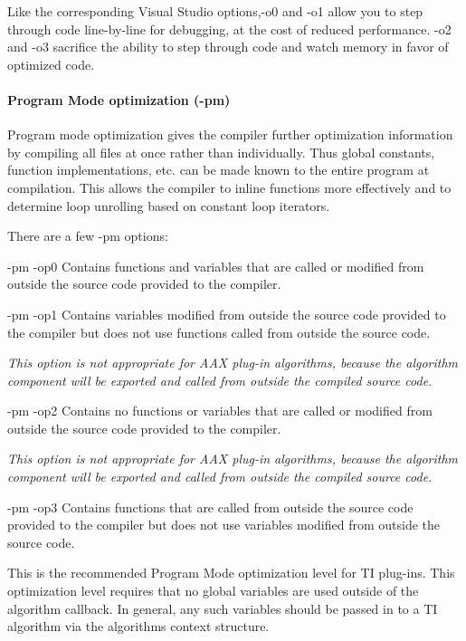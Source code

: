 Like the corresponding Visual Studio options,{\ttfamily -\/o0} and {\ttfamily -\/o1} allow you to step through code line-\/by-\/line for debugging, at the cost of reduced performance. {\ttfamily -\/o2} and {\ttfamily -\/o3} sacrifice the ability to step through code and watch memory in favor of optimized code.

\hypertarget{a00832_subsubsection__program_mode_optimization_pm_}{}\paragraph{Program Mode optimization (-\/pm)}\label{a00832_subsubsection__program_mode_optimization_pm_}
 Program mode optimization gives the compiler further optimization information by compiling all files at once rather than individually. Thus global constants, function implementations, etc. can be made known to the entire program at compilation. This allows the compiler to inline functions more effectively and to determine loop unrolling based on constant loop iterators.

There are a few {\ttfamily -\/pm} options\+:


\begin{DoxyItemize}
\item {\ttfamily -\/pm -\/op0}  Contains functions and variables that are called or modified from outside the source code provided to the compiler.  


\item {\ttfamily -\/pm -\/op1}  Contains variables modified from outside the source code provided to the compiler but does not use functions called from outside the source code. 

 {\itshape  This option is not appropriate for A\+AX plug-\/in algorithms, because the algorithm component will be exported and called from outside the compiled source code.}  


\item {\ttfamily -\/pm -\/op2}  Contains no functions or variables that are called or modified from outside the source code provided to the compiler. 

 {\itshape  This option is not appropriate for A\+AX plug-\/in algorithms, because the algorithm component will be exported and called from outside the compiled source code.}  


\item {\ttfamily -\/pm -\/op3}  Contains functions that are called from outside the source code provided to the compiler but does not use variables modified from outside the source code.  

 This is the recommended Program Mode optimization level for TI plug-\/ins. This optimization level requires that no global variables are used outside of the algorithm callback. In general, any such variables should be passed in to a TI algorithm via the algorithm\textquotesingle{}s context structure.  
\end{DoxyItemize}

